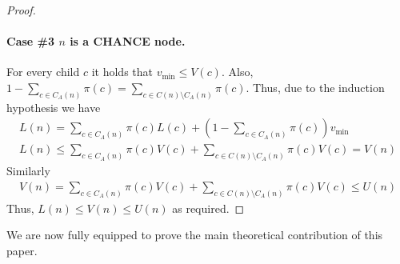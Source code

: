 \documentclass[runningheads]{llncs}
\newcommand{\MM}{\mathit{V}}
\newcommand{\pess}{\mathit{L}}
\newcommand{\opti}{\mathit{U}}
\newcommand{\vmax}{v_{\text{max}}}
\newcommand{\vmin}{v_{\text{min}}}
\begin{document}
\begin{proof}
\paragraph{Case \#3 $n$ is a CHANCE node.}
For every child $c$ it holds that $\vmin\leq \MM(c)$. 
Also, $1-\sum_{c\in C_A(n)} \pi(c) = \sum_{c\in C(n) \setminus C_A(n)} \pi(c)$. Thus, due to the induction hypothesis we have
\begin{align}
 \!\!\!\!\pess(n) \!\! = \!\!\!\!\!\!\sum_{c\in C_A(n)} \!\!\!\pi(c) \pess(c)+ (1-\!\!\!\!\sum_{c\in C_A(n)}\!\!\!\! \pi(c)) \vmin \\
 \!\pess(n) \!\! \leq \!\!\!\!\!\!\sum_{c\in C_A(n)} \!\!\!\pi(c) \MM(c)+ \!\!\!\!\!\!\!\!\sum_{c\in C(n) \setminus C_A(n)}\!\!\!\!\!\!\!\pi(c) \MM(c) = V(n)
\end{align}
Similarly
\begin{align}
 \!\MM(n) \!\! = \!\!\!\!\!\!\sum_{c\in C_A(n)} \!\!\!\pi(c) \MM(c)+ \!\!\!\!\!\!\!\!\sum_{c\in C(n) \setminus C_A(n)}\!\!\!\!\!\!\!\pi(c) \MM(c) \leq \opti(n)
\end{align}
Thus, $\pess(n) \leq \MM(n) \leq \opti(n)$ as required.
\end{proof}

We are now fully equipped to prove the main theoretical contribution of this paper.
\end{document}
